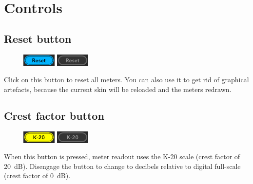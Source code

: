 \chapter{Controls}
\label{chap:controls}

\section{Reset button}
\label{sec:reset_button}

\begin{figure}
\includegraphics[scale=\screenshotscale,clip]{include/images/button_reset_on.png}
\newline \vspace{-0.9\baselineskip}
\includegraphics[scale=\screenshotscale,clip]{include/images/button_reset_off.png}
\end{figure}

Click on this button to reset all meters.  You can also use it to get
rid of graphical artefacts, because the current skin will be reloaded
and the meters redrawn.

\section{Crest factor button}
\label{sec:crest_factor_button}

\begin{figure}
\includegraphics[scale=\screenshotscale,clip]{include/images/button_crest_factor_on.png}
\newline \vspace{-0.9\baselineskip}
\includegraphics[scale=\screenshotscale,clip]{include/images/button_crest_factor_off.png}
\end{figure}

When this button is pressed, meter readout uses the K-20 scale (crest
factor of \SI{20}{\dB}).  Disengage the button to change to decibels
relative to digital full-scale (crest factor of \SI{0}{\dB}).

